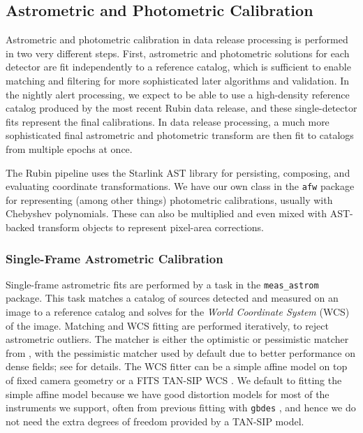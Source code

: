 \subsection{Astrometric and Photometric Calibration}
\label{sec:calibration}

Astrometric and photometric calibration in data release processing is performed in two very different steps.
First, astrometric and photometric solutions for each detector are fit independently to a reference catalog, which is sufficient to enable matching and filtering for more sophisticated later algorithms and validation.
In the nightly alert processing, we expect to be able to use a high-density reference catalog produced by the most recent Rubin data release, and these single-detector fits represent the final calibrations.
In data release processing, a much more sophisticated final astrometric and photometric transform are then fit to catalogs from multiple epochs at once.

The Rubin pipeline uses the Starlink AST library \citep{2016A&C....15...33B} for persisting, composing, and evaluating coordinate transformations.
We have our own class in the \texttt{afw} package for representing (among other things) photometric calibrations, usually with Chebyshev polynomials.
These can also be multiplied and even mixed with AST-backed transform objects to represent pixel-area corrections.

\subsubsection{Single-Frame Astrometric Calibration}
\label{sec:astrometryTask}

Single-frame astrometric fits are performed by a task in the \texttt{meas\_astrom} package.
This task matches a catalog of sources detected and measured on an image to a reference catalog and solves for the \textit{World Coordinate System} (WCS) of the image.
Matching and WCS fitting are performed iteratively, to reject astrometric outliers.
The matcher is either the optimistic or pessimistic matcher from \citet{2007PASA...24..189T}, with the pessimistic matcher used by default due to better performance on dense fields; see \citep{DMTN-031} for details.
The WCS fitter can be a simple affine model on top of fixed camera geometry or a FITS TAN-SIP WCS \citep{2005ASPC..347..491S}.
We default to fitting the simple affine model because we have good distortion models for most of the instruments we support, often from previous fitting with \texttt{gbdes} , and hence we do not need the extra degrees of freedom provided by a TAN-SIP model.

